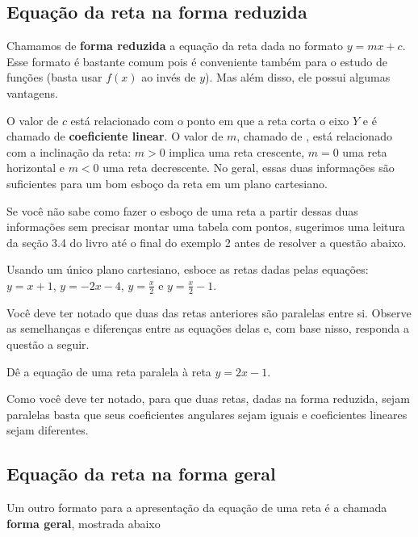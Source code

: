 \documentclass[main_estudante.tex]{subfiles}
\begin{document}
\subsection*{Equação da reta na forma reduzida}

Chamamos de \textbf{forma reduzida} a equação da reta dada no formato $y=mx+c$. Esse formato é bastante comum pois é conveniente também para o estudo de funções (basta usar $f(x)$ ao invés de $y$). Mas além disso, ele possui algumas vantagens.

O valor de $c$ está relacionado com o ponto em que a reta corta o eixo $Y$ e é chamado de \textbf{coeficiente linear}. O valor de $m$, chamado de , está relacionado com a inclinação da reta: $m>0$ implica uma reta crescente, $m=0$ uma reta horizontal e $m<0$ uma reta decrescente. No geral, essas duas informações são suficientes para um bom esboço da reta em um plano cartesiano.

Se você não sabe como fazer o esboço de uma reta a partir dessas duas informações sem precisar montar uma tabela com pontos, sugerimos uma leitura da seção 3.4 do livro  até o final do exemplo 2 antes de resolver a questão abaixo.

\begin{questao}
Usando um único plano cartesiano, esboce as retas dadas pelas equações: $y=x+1$, $y=-2x-4$, $y=\frac{x}{2}$ e $y=\frac{x}{2}-1$.
\end{questao}

Você deve ter notado que duas das retas anteriores são paralelas entre si. Observe as semelhanças e diferenças entre as equações delas e, com base nisso, responda a questão a seguir.

\begin{questao}
Dê a equação de uma reta paralela à reta $y=2x-1$.
\end{questao}

Como você deve ter notado, para que duas retas, dadas na forma reduzida, sejam paralelas basta que seus coeficientes angulares sejam iguais e coeficientes lineares sejam diferentes.

\subsection*{Equação da reta na forma geral}

Um outro formato para a apresentação da equação de uma reta é a chamada \textbf{forma geral}, mostrada abaixo
\end{document}
